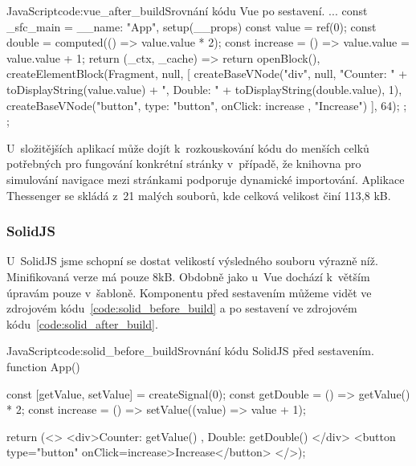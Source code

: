 \documentclass[
  master,
  program=ainf,
  printversion,
  tables=false,
  sourcecodes,
  glossaries,
  index
]{kidiplom}
\begin{document}
  \begin{kicode}{JavaScript}{code:vue_after_build}{Srovnání kódu Vue po sestavení.}
    ...
    const _sfc_main = {
      __name: "App",
      setup(__props) {
        const value = ref(0);
        const double = computed(() => value.value * 2);
        const increase = () => value.value = value.value + 1;
        return (_ctx, _cache) => {
          return openBlock(), createElementBlock(Fragment, null, [
            createBaseVNode("div", null, "Counter: " + toDisplayString(value.value) + ", Double: " + toDisplayString(double.value), 1),
            createBaseVNode("button", {
              type: "button",
              onClick: increase
            }, "Increase")
          ], 64);
        };
      }
    };
\end{kicode}

U~složitějších aplikací může dojít k~rozkouskování kódu do menších celků potřebných pro fungování
konkrétní stránky v~případě, že knihovna pro simulování navigace mezi stránkami podporuje dynamické importování.
Aplikace Thessenger se skládá z~21 malých souborů, kde celková velikost činí 113,8 kB.

\subsubsection{SolidJS}
U~SolidJS jsme schopní se dostat velikostí výsledného souboru výrazně níž. Minifikovaná verze má pouze
8kB. Obdobně jako u~Vue dochází k~větším úpravám pouze v~šabloně. Komponentu před sestavením můžeme vidět
ve zdrojovém kódu~\ref{code:solid_before_build} a po sestavení ve zdrojovém kódu~\ref{code:solid_after_build}.

  \begin{kicode}{JavaScript}{code:solid_before_build}{Srovnání kódu SolidJS před sestavením.}
    function App() {
      const [getValue, setValue] = createSignal(0);
      const getDouble = () => getValue() * 2;
      const increase = () => setValue((value) => value + 1);
    
      return (<>
        <div>Counter: { getValue() }, Double: { getDouble() }</div>
        <button type="button" onClick={increase}>Increase</button>
      </>);
    }
\end{kicode}

\end{document}
